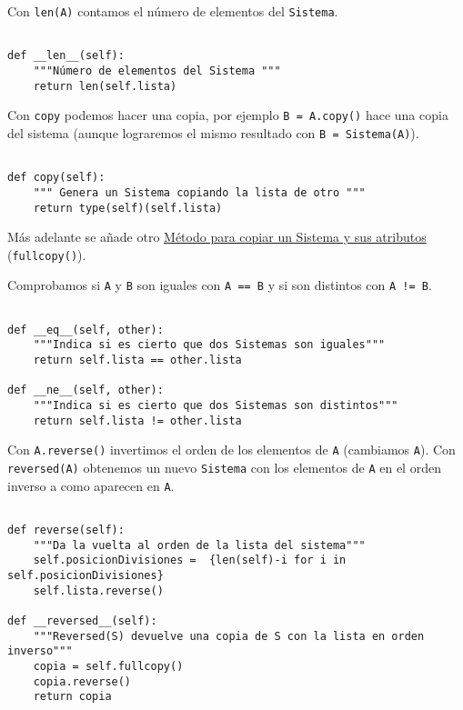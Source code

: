 \documentclass[11pt]{report}
\begin{document}
Con \texttt{len(A)} contamos el número de elementos del \texttt{Sistema}. 

\begin{verbatim}

def __len__(self):
    """Número de elementos del Sistema """
    return len(self.lista)

\end{verbatim}

Con \texttt{copy} podemos hacer una copia, por ejemplo \texttt{B = A.copy()} hace
una copia del sistema  (aunque lograremos el mismo resultado con
\texttt{B = Sistema(A)}).

\begin{verbatim}

def copy(self):
    """ Genera un Sistema copiando la lista de otro """
    return type(self)(self.lista)

\end{verbatim}

Más adelante se añade otro \hyperref[sec:org85c56e1]{Método para copiar un Sistema y sus atributos} (\texttt{fullcopy()}).

Comprobamos si \texttt{A} y \texttt{B} son iguales con \texttt{A == B} y si son distintos con
\texttt{A != B}.

\begin{verbatim}

def __eq__(self, other):
    """Indica si es cierto que dos Sistemas son iguales"""
    return self.lista == other.lista

def __ne__(self, other):
    """Indica si es cierto que dos Sistemas son distintos"""
    return self.lista != other.lista

\end{verbatim}

Con \texttt{A.reverse()} invertimos el orden de los elementos de \texttt{A}
(cambiamos \texttt{A}). Con \texttt{reversed(A)} obtenemos un nuevo \texttt{Sistema} con
los elementos de \texttt{A} en el orden inverso a como aparecen en \texttt{A}.

\begin{verbatim}

def reverse(self):
    """Da la vuelta al orden de la lista del sistema"""
    self.posicionDivisiones =  {len(self)-i for i in self.posicionDivisiones}
    self.lista.reverse()
    
def __reversed__(self):
    """Reversed(S) devuelve una copia de S con la lista en orden inverso"""
    copia = self.fullcopy()
    copia.reverse()
    return copia
    
\end{verbatim}
\end{document}
